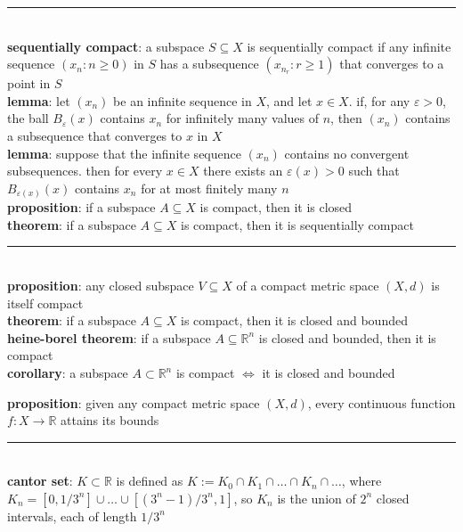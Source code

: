 \documentclass[a4paper]{article}
\newcommand*\linesep[0]{\noindent\rule{\textwidth}{0.5pt}\\}
\begin{document}
\begin{multicols}{2}
\begin{framed}
	\linesep
	\textbf{sequentially compact}: a subspace $S \subseteq X$ is sequentially compact if any infinite sequence $(x_n : n \geq 0)$ in $S$ has a subsequence $(x_{n_r} : r \geq 1)$ that converges to a point in $S$\\
	
	\noindent
	\textbf{lemma}: let $(x_n)$ be an infinite sequence in $X$, and let $x \in X$. if, for any $\varepsilon > 0$, the ball $B_\varepsilon(x)$ contains $x_n$ for infinitely many values of $n$, then $(x_n)$ contains a subsequence that converges to $x$ in $X$\\
	
	\noindent
	\textbf{lemma}: suppose that the infinite sequence $(x_n)$ contains no convergent subsequences. then for every $x \in X$ there exists an $\varepsilon(x) > 0$ such that $B_{\varepsilon(x)}(x)$ contains $x_n$ for at most finitely many $n$\\
	
	\noindent
	\textbf{proposition}: if a subspace $A \subseteq X$ is compact, then it is closed\\
	
	\noindent
	\textbf{theorem}: if a subspace $A \subseteq X$ is compact, then it is sequentially compact
	
	\linesep
	\textbf{proposition}: any closed subspace $V \subseteq X$ of a compact metric space $(X,d)$ is itself compact\\
	
	\noindent
	\textbf{theorem}: if a subspace $A \subseteq X$ is compact, then it is closed and bounded\\
	
	\noindent
	\textbf{heine-borel theorem}: if a subspace $A \subseteq \mathbb{R}^n$ is closed and bounded, then it is compact\\
	
	\noindent
	\textbf{corollary}: a subspace $A \subset \mathbb{R}^n$ is compact $\iff$ it is closed and bounded
	\end{framed}

	\begin{framed}
	\noindent
	\textbf{proposition}: given any compact metric space $(X,d)$, every continuous function $f: X \rightarrow \mathbb{R}$ attains its bounds
	
	\linesep
	\textbf{cantor set}: $K \subset \mathbb{R}$ is defined as $K := K_0 \cap K_1 \cap \dots \cap K_n \cap \dots$, where $K_n = [0, 1/3^n] \cup \dots \cup [(3^n - 1) / 3^n, 1]$, so $K_n$ is the union of $2^n$ closed intervals, each of length $1/3^n$\\
	

\end{framed}
\end{multicols}
\end{document}
